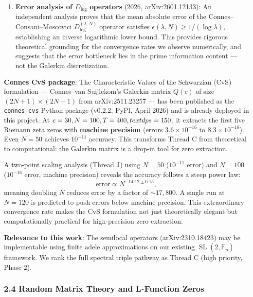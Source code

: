 \documentclass[
]{article}
\begin{document}
\begin{enumerate}
  two-point scaling law (\(N^{-14.1}\)): the true convergence is in the
  prime cutoff \(c\), not just the matrix size \(N\), with error
  decaying super-exponentially as \(c\) increases.
\item
  \textbf{Error analysis of \(D_{\log}\) operators} (2026,
  arXiv:2601.12133): An independent analysis proves that the mean
  absolute error of the Connes--Consani--Moscovici
  \(D_{\log}^{(\lambda,N)}\) operator satisfies
  \(\epsilon(\lambda,N) \ge 1/(\log\lambda)\), establishing an inverse
  logarithmic lower bound. This provides rigorous theoretical grounding
  for the convergence rates we observe numerically, and suggests that
  the error bottleneck lies in the prime information content --- not the
  Galerkin discretization.
\end{enumerate}

\textbf{Connes CvS package}: The Characteristic Values of the Schwarzian
(CvS) formulation --- Connes--van Suijlekom's Galerkin matrix \(Q(c)\)
of size \((2N+1)\times(2N+1)\) from arXiv:2511.23257 --- has been
published as the \texttt{connes-cvs} Python package (v0.2.2, PyPI, April
2026) and is already deployed in this project. At
\(c=30,N=100,T=400,\\text{dps}=150\), it extracts the first five Riemann
zeta zeros with \textbf{machine precision} (errors
\(3.6\times 10^{-16}\) to \(8.3\times 10^{-16}\)). Even \(N=50\)
achieves \(10^{-11}\) accuracy. This transforms Thread C from
theoretical to computational: the Galerkin matrix is a drop-in tool for
zero extraction.

A two-point scaling analysis (Thread J) using \(N=50\) (\(10^{-11}\)
error) and \(N=100\) (\(10^{-16}\) error, machine precision) reveals the
accuracy follows a steep power law:
\[\text{error} \propto N^{-14.12 \pm 0.15},\] meaning doubling \(N\)
reduces error by a factor of \(\sim 17{,}800\). A single run at
\(N=120\) is predicted to push errors below machine precision. This
extraordinary convergence rate makes the CvS formulation not just
theoretically elegant but computationally practical for high-precision
zero extraction.

\textbf{Relevance to this work}: The semilocal operators
(arXiv:2310.18423) may be implementable using finite adele
approximations on our existing \(\operatorname{SL}(2,\mathbb{F}_p)\)
framework. We rank the full spectral triple pathway as Thread C (high
priority, Phase 2).

\hypertarget{random-matrix-theory-and-l-function-zeros}{%
\subsubsection{2.4 Random Matrix Theory and L-Function
Zeros}\label{random-matrix-theory-and-l-function-zeros}}
\end{document}
